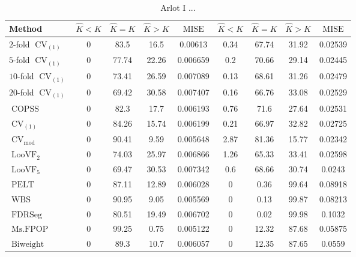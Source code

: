 \begin{table}[ht]
\centering
\begin{tabular}{|l|cccc|cccc|}
  \hline
Method & $\hat{K} < K$ & $\hat{K} = K$ & $\hat{K} > K$ & $\operatorname{MISE}$ & $\hat{K} < K$ & $\hat{K} = K$ & $\hat{K} > K$ & $\operatorname{MISE}$ \\ 
  \hline
$2$-fold $\operatorname{CV}_{(1)}$ &     0 &  83.5 &  16.5 & 0.00613 &  0.34 & 67.74 & 31.92 & 0.02539 \\ 
  $5$-fold $\operatorname{CV}_{(1)}$ &     0 & 77.74 & 22.26 & 0.006659 &   0.2 & 70.66 & 29.14 & 0.02445 \\ 
  $10$-fold $\operatorname{CV}_{(1)}$ &     0 & 73.41 & 26.59 & 0.007089 &  0.13 & 68.61 & 31.26 & 0.02479 \\ 
  $20$-fold $\operatorname{CV}_{(1)}$ &     0 & 69.42 & 30.58 & 0.007407 &  0.16 & 66.76 & 33.08 & 0.02529 \\ 
  $\operatorname{COPSS}$ &     0 &  82.3 &  17.7 & 0.006193 &  0.76 &  71.6 & 27.64 & 0.02531 \\ 
  $\operatorname{CV}_{(1)}$ &     0 & 84.26 & 15.74 & 0.006199 &  0.21 & 66.97 & 32.82 & 0.02725 \\ 
  $\operatorname{CV}_{\operatorname{mod}}$ &     0 & 90.41 &  9.59 & 0.005648 &  2.87 & 81.36 & 15.77 & 0.02342 \\ 
  $\operatorname{LooVF}_2$ &     0 & 74.03 & 25.97 & 0.006866 &  1.26 & 65.33 & 33.41 & 0.02598 \\ 
  $\operatorname{LooVF}_5$ &     0 & 69.47 & 30.53 & 0.007342 &   0.6 & 68.66 & 30.74 & 0.0243 \\ 
  $\operatorname{PELT}$ &     0 & 87.11 & 12.89 & 0.006028 &     0 &  0.36 & 99.64 & 0.08918 \\ 
  $\operatorname{WBS}$ &     0 & 90.95 &  9.05 & 0.005569 &     0 &  0.13 & 99.87 & 0.08213 \\ 
  $\operatorname{FDRSeg}$ &     0 & 80.51 & 19.49 & 0.006702 &     0 &  0.02 & 99.98 & 0.1032 \\ 
  $\operatorname{Ms.FPOP}$ &     0 & 99.25 &  0.75 & 0.005122 &     0 & 12.32 & 87.68 & 0.05875 \\ 
  $\operatorname{Biweight}$ &     0 &  89.3 &  10.7 & 0.006057 &     0 & 12.35 & 87.65 & 0.0559 \\ 
   \hline
\end{tabular}
\caption{Arlot I ...} 
\end{table}

